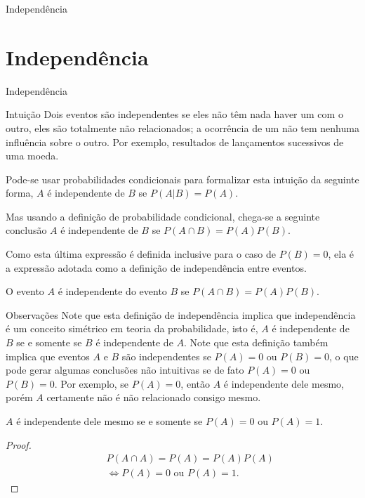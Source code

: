 \begin{frame}
	\vspace{4cm}
	\begin{block}{Independência}
		{}
	\end{block}
\end{frame}

\section{Independência}

\begin{frame}{Independência}
\begin{block}{Intuição}
	Dois eventos são independentes
	se eles não têm nada haver um com o
	outro, eles são totalmente não relacionados; a ocorrência de um não
	tem nenhuma influência sobre o outro. Por exemplo, resultados de lançamentos sucessivos de uma moeda.
\end{block}
%
\begin{defi}
	Pode-se usar probabilidades condicionais
	para formalizar esta intuição da seguinte forma, $A$ é
	independente de $B$ se $P(A|B)=P(A)$. 
	
	Mas usando a definição de
	probabilidade condicional, chega-se a seguinte conclusão $A$ é
	independente de $B$ se $P(A\cap B)=P(A)P(B)$. 
	
	Como esta última
	expressão é definida inclusive para o caso de $P(B)=0$, ela é a
	expressão adotada como a definição de independência entre eventos.
	\end{defi}

	\begin{defi}
		O evento $A$ é independente do evento $B$ se $P(A\cap B)=P(A)P(B)$.
	\end{defi}
\end{frame}
%






\begin{frame}
\begin{block}{Observações}
Note que esta definição de independência implica que independência é
um conceito simétrico em teoria da probabilidade, isto é, $A$ é
independente de $B$ se e somente se $B$ é independente de $A$. Note
que esta definição também implica que eventos $A$ e $B$ são
independentes se $P(A)=0$ ou $P(B)=0$, o que pode gerar algumas
conclusões não intuitivas se de fato $P(A)=0$ ou $P(B)=0$. Por
exemplo, se $P(A)=0$, então $A$ é independente dele mesmo, porém $A$
certamente não é não relacionado consigo mesmo.
\end{block}

\begin{teo}
	$A$ é independente dele mesmo se e somente se $P(A)=0$ ou $P(A)=1$.
\end{teo}
\begin{proof}
\begin{eqnarray}
& & P(A\cap A)=P(A)=P(A)P(A) \nonumber\\
& & \Leftrightarrow P(A)=0 \mbox{ ou } P(A)=1.\nonumber
\end{eqnarray}
\end{proof}

\end{frame}

